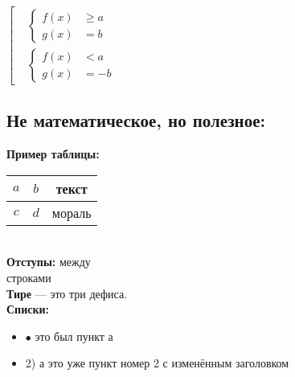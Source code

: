 \documentclass[12pt]{article}
\newenvironment{mylist} %
{ \begin{itemize}
    \setlength{\itemsep}{0pt}
    \setlength{\parskip}{0pt}
    \setlength{\parsep}{0pt}     }
{ \end{itemize}                  }
\begin{document}
$\left[\begin{aligned}
&\left\{\begin{aligned}
f(x) &\geqslant a \\
g(x) &= b
\end{aligned}\right.\\
&\left\{\begin{aligned}
f(x) &< a \\
g(x) &= -b
\end{aligned}\right.
\end{aligned}\right.$

\subsection*{\textcolor{Emerald}{\textbf{Не математическое, но полезное:}}}
\textbf{Пример таблицы:}

\begin{tabular}{|c|c|c|}
\hline
    $a$ & $b$ & текст
\\\hline
    $c$ & $d$ & мораль
\\\hline
\end{tabular}\\

\textbf{Отступы:} между\smallskip\\ строками\medskip\\ \textbf{Тире} --- это три дефиса.\\
\textbf{Списки:}
\begin{mylist}
\item [$\bullet$] это был пункт а
\item [2)] а это уже пункт номер 2 с изменённым заголовком
\end{mylist}
\end{document}
